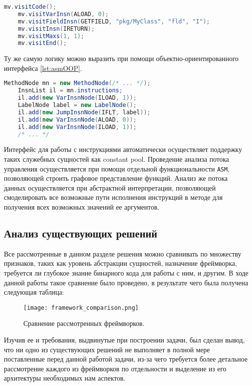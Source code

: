 \begin{lstlisting}[language=Java, caption=Пример использования событийного интерфейса., label=lst:asmVisitor]
    mv.visitCode();
    mv.visitVarInsn(ALOAD, 0);
    mv.visitFieldInsn(GETFIELD, "pkg/MyClass", "fld", "I");
    mv.visitInsn(IRETURN);
    mv.visitMaxs(1, 1);
    mv.visitEnd();
\end{lstlisting}

Ту же самую логику можно выразить при помощи объектно-ориентированного интерфейса \autoref{lst:asmOOP}.

\begin{lstlisting}[language=Java, caption=Пример использования объектно-ориентированного интерфейса., label=lst:asmOOP]
    MethodNode mn = new MethodNode(/* ... */);
    InsnList il = mn.instructions;
    il.add(new VarInsnNode(ILOAD, 1));
    LabelNode label = new LabelNode();
    il.add(new JumpInsnNode(IFLT, label));
    il.add(new VarInsnNode(ALOAD, 0));
    il.add(new VarInsnNode(ILOAD, 1));
    /* ... */
\end{lstlisting}

Интерфейс для работы с инструкциями автоматически осуществляет поддержку таких служебных сущностей как constant pool. Проведение анализа потока управления осуществляется при помощи отдельной функциональности \texttt{ASM}, позволяющей строить графовое представление функций. Анализ же потока данных осуществляется при абстрактной интерпретации, позволяющей смоделировать все возможные пути исполнения инструкций в методе для получения всех возможных значений ее аргументов.

\subsection{Анализ существующих решений}

Все рассмотренные в данном разделе решения можно сравнивать по множеству признаков, таких как уровень абстракции сущностей, назначение фреймворка, требуется ли глубокое знание бинарного кода для работы с ним, и другим. В ходе данной работы такое сравнение было проведено, в результате чего была получена следующая таблица:

\begin{figure}[h]
\centering
\texttt{[image: framework\_comparison.png]}
\caption{Сравнение рассмотренных фреймворков.}
\label{fig:kavaArch}
\end{figure}

Изучив ее и требования, выдвинутые при построении задачи, был сделан вывод, что ни одно из существующих решений не выполняет в полной мере поставленные перед данной работой задачи, из-за чего требуется более детальное рассмотрение каждого из фреймворков по отдельности и выделение из его архитектуры необходимых нам аспектов.

\newpage
